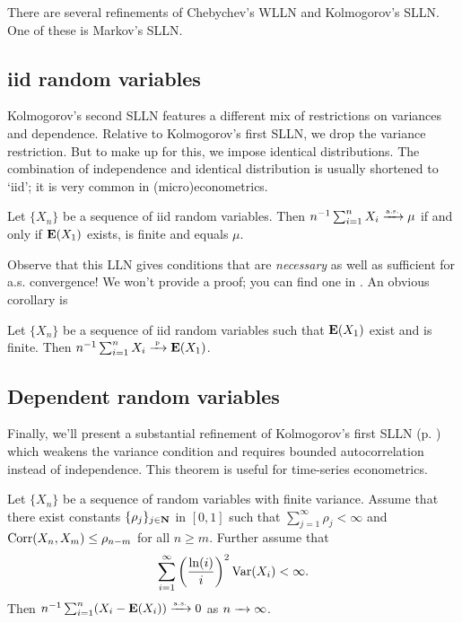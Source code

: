 \documentclass[11pt,letterpaper,reqno,oneside]{article}
\begin{document}
There are several refinements of Chebychev's WLLN and Kolmogorov's SLLN. One of these is Markov's SLLN.



\subsection{iid random variables}
\label{sec:LLNs:iid}

Kolmogorov's second SLLN features a different mix of restrictions on variances and dependence. Relative to Kolmogorov's first SLLN, we drop the variance restriction. But to make up for this, we impose identical distributions. The combination of independence and identical distribution is usually shortened to `iid'; it is very common in (micro)econometrics.

\begin{theorem}
	\label{theorem:Kolmogorov_2nd_SLLN}
	Let $\{ X_n \}$ be a sequence of iid random variables. Then $n^{-1} \sum_{i=1}^n X_i \xrightarrow{{\scriptscriptstyle \mathrm{a.s.}}} \mu$ if and only if $\mathbf{E}(X_1)$ exists, is finite and equals $\mu$.
\end{theorem}

Observe that this LLN gives conditions that are \emph{necessary} as well as sufficient for a.s. convergence! We won't provide a proof; you can find one in \textcite[][pp. 115--6]{Rao1973}. An obvious corollary is
%
\begin{corollary}
	\label{corollary:Khinchine_WLLN}
	Let $\{ X_n \}$ be a sequence of iid random variables such that $\mathbf{E}(X_1)$ exist and is finite. Then $n^{-1} \sum_{i=1}^n X_i \xrightarrow{{\scriptscriptstyle \mathrm{\;p\;}}} \mathbf{E}(X_1)$.
\end{corollary}



\subsection{Dependent random variables}
\label{sec:LLNs:Serfling}

Finally, we'll present a substantial refinement of Kolmogorov's first SLLN (p. \pageref{theorem:Kolmogorov_1st_SLLN}) which weakens the variance condition and requires bounded autocorrelation instead of independence. This theorem is useful for time-series econometrics.

\begin{theorem}
	\label{theorem:Serfling_SLLN}
	Let $\{ X_n \}$ be a sequence of random variables with finite variance. Assume that there exist constants $\{ \rho_j \}_{j\in\mathbf{N}}$ in $[0,1]$ such that $\sum_{j=1}^\infty \rho_j < \infty$ and $\mathrm{Corr}(X_n,X_m) \leq \rho_{n-m}$ for all $n \geq m$. Further assume that
	\begin{equation*}
		\sum_{i=1}^\infty \left( \frac{\ln(i)}{i} \right)^2 \mathrm{Var}(X_i) < \infty .
	\end{equation*}
	Then $n^{-1} \sum_{i=1}^n ( X_i - \mathbf{E}(X_i) ) \xrightarrow{{\scriptscriptstyle \mathrm{a.s.}}} 0$ as $n\xrightarrow{\;\;\;}\infty$.
\end{theorem}
\end{document}
